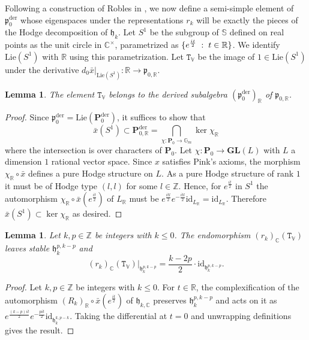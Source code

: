 \documentclass[10pt]{article}
\numberwithin{equation}{subsection}
\theoremstyle{plain}
\newtheorem{lemma}[theorem]{Lemma}
\theoremstyle{definition}
\theoremstyle{remark}
\newcommand{\lie}{\mathrm{Lie}}
\newcommand{\Z}{\mathbb Z}
\newcommand{\C}{\mathbb C}
\newcommand{\R}{\mathbb R}
\newcommand{\V}{\mathbb V}
\newcommand{\s}{\mathbb S}
\newcommand{\mult}{\mathbb G}
\newcommand{\pp}{\mathbf P}
\newcommand{\mon}{\mathbf H}
\newcommand{\id}{\mathrm{id}}
\newcommand{\gr}{\mathrm{Gr}}
\newcommand{\gl}{\mathbf{GL}}
\newcommand{\para}{\mathfrak{p}}
\newcommand{\ort}{\mathfrak{h}}
\newcommand{\der}{\mathrm{der}}
\newcommand{\ortl}{\mathfrak{l}}
\begin{document}
Following a construction of Robles in \cite[Sect. 3]{robles}, we now define a semi-simple element of $\para_0^\der$ whose eigenspaces under the representations $r_k$ will be exactly the pieces of the Hodge decomposition of $\ort_k$. Let $S^1$ be the subgroup of $\s$ defined on real points as the unit circle in $\C^\times$, parametrized as $\{e^{\frac{it}{2}} \hspace{0.1cm} : \hspace{0.1cm} t \in \R\}$. We identify $\lie(S^1)$ with $\R$ using this parametrization. Let $\mathtt{T}_\V$ be the image of $1 \in \lie(S^1)$ under the derivative $d_0 \bar{x} \vert_{\lie(S^1)} : \R \rightarrow \para_{0, \R}$.
\begin{lemma}
The element $\mathtt{T}_\V$ belongs to the derived subalgebra $(\para_0^\der)_\R$ of $\para_{0,\R}$.
\end{lemma}
\begin{proof}
Since $\para_0^\der = \lie(\pp_0^\der)$, it suffices to show that \[\bar{x}(S^1) \subset \pp_{0, \R}^\der = \bigcap_{\chi : \pp_0 \rightarrow \mult_m} \ker{\chi_\R}\] where the intersection is over characters of $\pp_0$. Let $\chi : \pp_0 \rightarrow \gl(L)$ with $L$ a dimension $1$ rational vector space. Since $x$ satisfies Pink's axioms, the morphism $\chi_\R \circ \bar{x}$ defines a pure Hodge structure on $L$. As a pure Hodge structure of rank $1$ it must be of Hodge type $(l,l)$ for some $l \in \Z$. Hence, for $e^{\frac{it}{2}}$ in $S^1$ the automorphism $\chi_\R \circ \bar{x}(e^{\frac{it}{2}})$ of $L_\R$ must be $e^{\frac{itl}{2}} e^{-\frac{itl}{2}} \id_{L_\R} = \id_{L_\R}$. Therefore $\bar{x}(S^1) \subset \ker{\chi_\R}$ as desired.
\end{proof}
\begin{lemma}\label{gradnontriv}
Let $k,p \in \Z$ be integers with $k \leqslant 0$. The endomorphism $(r_k)_\C(\mathtt{T}_\V)$ leaves stable $\ort_k^{p,k-p}$ and \[ (r_k)_\C(\mathtt{T}_\V) \vert_{\ort_k^{p,k-p}} = \frac{k-2p}{2} \cdot \id_{\ort_k^{p,k-p}}.\]
\end{lemma}
\begin{proof}
Let $k,p \in \Z$ be integers with $k \leqslant 0$. For $t \in \R$, the complexification of the automorphism $(R_k)_\R \circ \bar{x}(e^{\frac{it}{2}})$ of $\ort_{k,\C}$ preserves $\ort_k^{p,k-p}$ and acts on it as $e^{\frac{(k-p)it}{2}}e^{-\frac{pit}{2}}\id_{\ort_k^{k,p-k}}$. Taking the differential at $t = 0$ and unwrapping definitions gives the result.
\end{proof}
\end{document}
